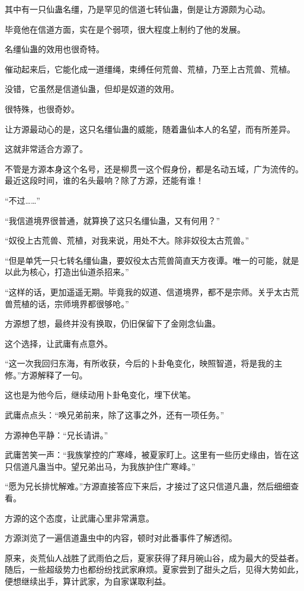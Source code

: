 
\begin{this_body}

其中有一只仙蛊名缰，乃是罕见的信道七转仙蛊，倒是让方源颇为心动。

毕竟他在信道方面，实在是个弱项，很大程度上制约了他的发展。

名缰仙蛊的效用也很奇特。

催动起来后，它能化成一道缰绳，束缚任何荒兽、荒植，乃至上古荒兽、荒植。

没错，它虽然是信道仙蛊，但却是奴道的效用。

很特殊，也很奇妙。

让方源最动心的是，这只名缰仙蛊的威能，随着蛊仙本人的名望，而有所差异。

这就非常适合方源了。

不管是方源本身这个名号，还是柳贯一这个假身份，都是名动五域，广为流传的。最近这段时间，谁的名头最响？除了方源，还能有谁！

“不过……”

“我信道境界很普通，就算换了这只名缰仙蛊，又有何用？”

“奴役上古荒兽、荒植，对我来说，用处不大。除非奴役太古荒兽。”

“但是单凭一只七转名缰仙蛊，要奴役太古荒兽简直天方夜谭。唯一的可能，就是以此为核心，打造出仙道杀招来。”

“这样的话，更加遥遥无期。毕竟我的奴道、信道境界，都不是宗师。关乎太古荒兽荒植的话，宗师境界都很够呛。”

方源想了想，最终并没有换取，仍旧保留下了金刚念仙蛊。

这个选择，让武庸有点意外。

“这一次我回归东海，有所收获，今后的卜卦龟变化，映照智道，将是我的主修。”方源解释了一句。

这也是为他今后，继续动用卜卦龟变化，埋下伏笔。

武庸点点头：“唤兄弟前来，除了这事之外，还有一项任务。”

方源神色平静：“兄长请讲。”

武庸苦笑一声：“我族掌控的广寒峰，被夏家盯上。这里有一些历史缘由，皆在这只信道凡蛊当中。望兄弟出马，为我族护住广寒峰。”

“愿为兄长排忧解难。”方源直接答应下来后，才接过了这只信道凡蛊，然后细细查看。

方源的这个态度，让武庸心里非常满意。

方源浏览了一遍信道蛊虫中的内容，顿时对此番事件了解透彻。

原来，炎荒仙人战胜了武雨伯之后，夏家获得了拜月碗山谷，成为最大的受益者。随后，一些超级势力也都纷纷找武家麻烦。夏家尝到了甜头之后，见得大势如此，便想继续出手，算计武家，为自家谋取利益。


\end{this_body}
